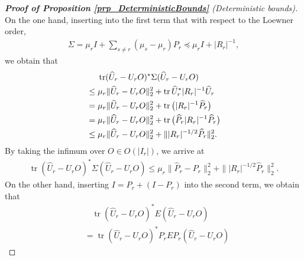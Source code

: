 \documentclass[a4paper,11pt]{article} %
\numberwithin{equation}{section}
\DeclareMathOperator*{\tr}{tr}
\theoremstyle{definition}
\theoremstyle{remark}
\theoremstyle{plain}
\begin{document}
\begin{proof}[\normalfont \textbf{Proof of Proposition \ref{prp_DeterministicBounds}} (Deterministic bounds)]
    On the one hand, inserting into the first term that with respect to the Loewner order,
    \begin{align}
      \Sigma = \mu_rI+\sum_{s\neq r}(\mu_s-\mu_r)P_r\preceq \mu_rI+|R_r|^{-1},
    \end{align}
    we obtain that
    \begin{align}
      & \ \ \ \
            \tr (\widehat U_r - U_r O)^{*} \Sigma (\widehat U_r - U_r O)
      \\
      &\le 
            \mu_r\| \widehat U_r- U_r O \|_{2}^{2} + \tr \widehat U_r^{*} |R_r|^{-1} \widehat U_r
      \notag
      \\
      & =
            \mu_r\| \widehat U_r- U_r O \|_{2}^{2}+\tr \big(|R_r|^{-1} \widehat P_r \big)
      \notag
      \\
      &=
            \mu_r\| \widehat U_r- U_r O \|_{2}^{2}+\tr \big(\widehat P_r|R_r|^{-1} \widehat P_r  \big)
      \notag
      \\
      & \le 
            \mu_r\| \widehat U_r- U_r O \|_{2}^{2}+\||R_r|^{-1/2}\widehat P_r\|_2^2.
      \notag
    \end{align}
    By taking the infimum over \( O \in O(| I_{r} |) \), we arrive at
    \begin{align} \label{eq_EigenfunctionComparison_2}
           \tr (\widehat U_r - U_r O)^{*} \Sigma (\widehat U_r - U_r O) 
      \le 
           \mu_r \| \widehat{P}_{r} - P_{r} \|_{2}^{2} + \||R_r|^{-1/2}\widehat P_r\|_2^2.
    \end{align}
    On the other hand, inserting $I=P_r+(I-P_r)$ into the second term, we obtain that
    \begin{align}
      & \ \ \ \
      \tr (\widehat U_r - U_r O)^{*} E (\widehat U_r - U_r O)
      \\
      & =
      \tr (\widehat U_r - U_r O)^{*} P_r E P_r (\widehat U_r - U_r O)

\end{align}
\end{proof}
\end{document}
